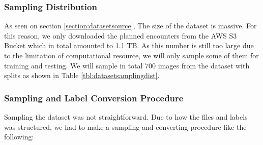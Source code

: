     \subsubsection{Sampling Distribution}
    As seen on section \ref{section:datasetsource}, The size of the dataset is massive.
    For this reason, we only downloaded the planned encounters from the AWS S3 Bucket which 
    in total amounted to 1.1 TB. As this number is still too large
    due to the limitation of computational resource, we will only sample some of them
    for training and testing. We will sample in total 700 images from the dataset with splits
    as shown in Table \ref{tbl:datasetsamplingdist}.
    \begin{table}[H]
      \centering
      \label{tbl:datasetsamplingdist}
      
    \end{table}
    
    \subsubsection{Sampling and Label Conversion Procedure}
    Sampling the dataset was not straightforward. Due to how the \textcite{aot_dataset} files and labels was structured,
    we had to make a sampling and converting procedure like the following:

